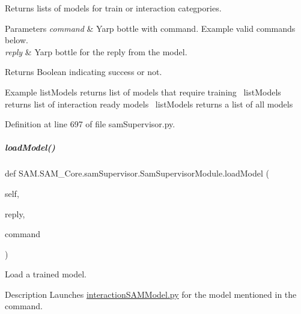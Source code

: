 Returns lists of models for train or interaction categpories. 


\begin{DoxyParams}{Parameters}
{\em command} & Yarp bottle with command. Example valid commands below. \\
\hline
{\em reply} & Yarp bottle for the reply from the model.\\
\hline
\end{DoxyParams}
\begin{DoxyParagraph}{Returns}
Boolean indicating success or not.
\end{DoxyParagraph}
\begin{DoxyParagraph}{Example}
list\+Models returns list of models that require training~\newline
 list\+Models returns list of interaction ready models~\newline
 list\+Models returns a list of all models 
\end{DoxyParagraph}


Definition at line 697 of file sam\+Supervisor.\+py.

\mbox{\label{group__icubclient__SAM__Core_a1f0530b19957492cfd68befff45b5721}} 
\subparagraph{\texorpdfstring{load\+Model()}{loadModel()}}
{\footnotesize\ttfamily def S\+A\+M.\+S\+A\+M\+\_\+\+Core.\+sam\+Supervisor.\+Sam\+Supervisor\+Module.\+load\+Model (\begin{DoxyParamCaption}\item[{}]{self,  }\item[{}]{reply,  }\item[{}]{command }\end{DoxyParamCaption})}



Load a trained model. 

\begin{DoxyParagraph}{Description}
Launches \hyperlink{interactionSAMModel_8py}{interaction\+S\+A\+M\+Model.\+py} for the model mentioned in the command.
\end{DoxyParagraph}

